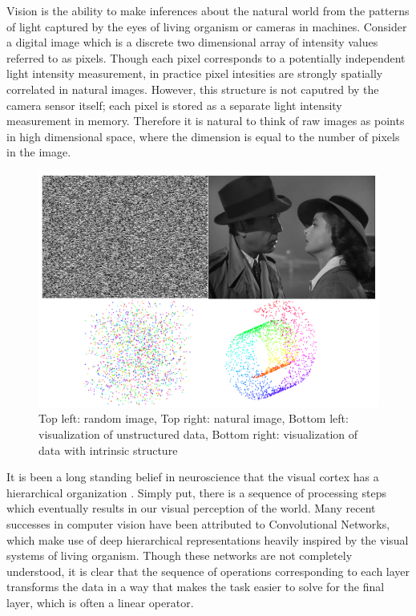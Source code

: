 Vision is the ability to make inferences about the natural world from the
patterns of light captured by the eyes of living organism or cameras in
machines. Consider a digital image which is a discrete two dimensional array of
intensity values referred to as pixels. Though each pixel corresponds to a
potentially independent light intensity measurement, in practice pixel
intesities are strongly spatially correlated in natural images. However, this
structure is not caputred by the camera sensor itself; each pixel is stored as
a separate light intensity measurement in memory. Therefore it is natural to 
think of raw images as points in high dimensional space, where the dimension is 
equal to the number of pixels in the image.         

\begin{figure}[ht]
\centering
\includegraphics[scale=0.3]{./figures/introduction/structure.png}
\caption{Top left: random image, Top right: natural image, Bottom left:
visualization of unstructured data, Bottom right: visualization of data with
intrinsic structure} \label{fig:LISTA} 
\end{figure}  


It is been a long standing belief in neuroscience that the visual
cortex has a hierarchical organization \cite{hubel1968,felleman1991}. Simply
put, there is a sequence of processing steps which eventually results in our
visual perception of the world. Many recent successes in computer vision have
been attributed to Convolutional Networks, which make use of deep hierarchical
representations heavily inspired by the visual systems of living organism.    
Though these networks are not completely understood, it is clear that 
the sequence of operations corresponding to each layer transforms the data in 
a way that makes the task easier to solve for the final layer, which is often 
a linear operator.    







 
